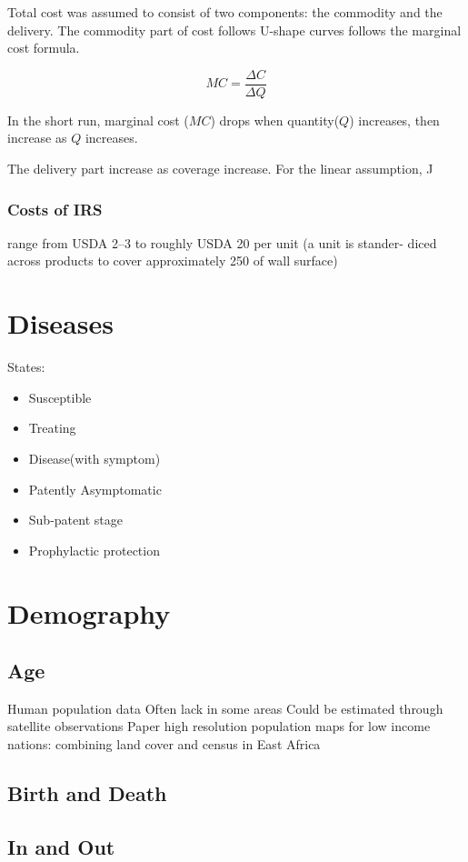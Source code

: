 \documentclass[a4paper, 12pt, twoside]{article}
\begin{document}
Total cost was assumed to consist of two components: the commodity and the delivery. The commodity part of cost follows U-shape curves follows the marginal cost formula.

$$ MC = \frac{\Delta C}{\Delta Q} $$

In the short run, marginal cost ($MC$) drops when quantity($Q$) increases, then increase as $Q$ increases.

The delivery part increase as coverage increase. For the linear assumption, J

\subsubsection{Costs of IRS}
range from USDA 2–3 to roughly USDA 20 per unit\cite{Oxborough2016}
(a unit is stander- diced across products to cover approximately 250 of wall surface)

\section{Diseases}
States:
\begin{itemize}
	\item Susceptible
	\item Treating
	\item Disease(with symptom)
	\item Patently Asymptomatic
	\item Sub-patent stage
	\item Prophylactic protection
\end{itemize}

\section{Demography}
\subsection{Age}
Human population data
Often lack in some areas
Could be estimated through satellite observations
Paper high resolution population maps for low income nations: combining land cover and census in East Africa

\subsection{Birth and Death}

\subsection{In and Out}
\end{document}
